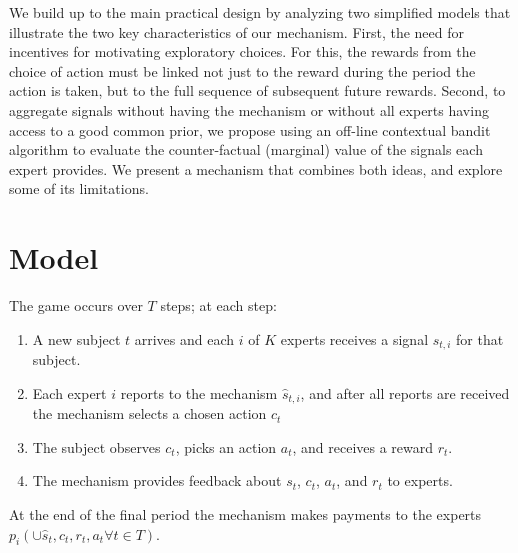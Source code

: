 We build up to the main practical design by analyzing two simplified models that illustrate the two key characteristics of our mechanism. 
First, the need for incentives for motivating exploratory choices.
For this, the rewards from the choice of action must be linked not just to the reward during the period the action is taken, but to the full sequence of subsequent future rewards.
Second, to aggregate signals without having the mechanism or without all experts having access to a good common prior, we propose using an off-line contextual bandit algorithm to evaluate the counter-factual (marginal) value of the signals each expert provides.
We present a mechanism that combines both ideas, and explore some of its limitations.











\section{Model}

The game occurs over $T$ steps; at each step: 

\begin{enumerate}
\item A new subject $t$ arrives and each $i$ of $K$ experts receives a signal $s_{t,i}$ for that subject.
\item Each expert $i$ reports to the mechanism $\hat{s}_{t,i}$, and after all reports are received the mechanism selects a chosen action $c_t$
\item The subject observes $c_t$, picks an action $a_t$, and receives a reward $r_t$.
\item The mechanism provides feedback about $s_t$, $c_t$, $a_t$, and $r_t$ to experts.
\end{enumerate}
At the end of the final period the mechanism makes payments to the experts $p_i( \cup \hat{s}_t,c_t,r_t,a_t \forall t \in T)$.



